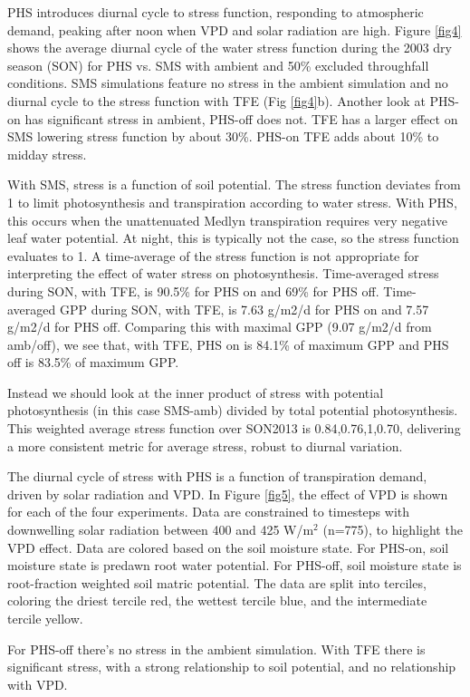 \documentclass[draft,linenumbers]{agujournal}
\begin{document}
PHS introduces diurnal cycle to stress function, responding to atmospheric demand, peaking after noon
when VPD and solar radiation are high. 
Figure \ref{fig4} shows the average diurnal cycle of the water stress function during the 2003 dry season (SON)
for PHS vs. SMS with ambient and 50\% excluded throughfall conditions.
SMS simulations feature no stress in the ambient simulation and no diurnal cycle to the stress function with TFE (Fig \ref{fig4}b).
Another look at PHS-on has significant stress in ambient, PHS-off does not.
TFE has a larger effect on SMS lowering stress function by about 30\%.
PHS-on TFE adds about 10\% to midday stress.

With SMS, stress is a function of soil potential.
The stress function deviates from 1 to limit photosynthesis and transpiration according to water stress.
With PHS, this occurs when the unattenuated Medlyn transpiration requires very negative leaf water potential.
At night, this is typically not the case, so the stress function evaluates to 1. 
A time-average of the stress function is not appropriate for interpreting the effect of water stress on photosynthesis.
Time-averaged stress during SON, with TFE, is 90.5\% for PHS on and 69\% for PHS off.
Time-averaged GPP during SON,  with TFE, is 7.63 g/m2/d for PHS on and 7.57 g/m2/d for PHS off.
Comparing this with maximal GPP (9.07 g/m2/d from amb/off), we see that,
with TFE, PHS on is 84.1\% of maximum GPP and PHS off is 83.5\% of maximum GPP.

Instead we should look at the inner product of stress with potential photosynthesis (in this case SMS-amb) divided by total potential photosynthesis.
This weighted average stress function over SON2013 is 0.84,0.76,1,0.70, delivering a more consistent metric for average stress, robust to diurnal variation.

The diurnal cycle of stress with PHS is a function of transpiration demand, driven by solar radiation and VPD. 
In Figure \ref{fig5}, the effect of VPD is shown for each of the four experiments. 
Data are constrained to timesteps with downwelling solar radiation between 400 and 425 W/m$^2$ (n=775), to highlight the VPD effect. 
Data are colored based on the soil moisture state. 
For PHS-on, soil moisture state is predawn root water potential. 
For PHS-off, soil moisture state is root-fraction weighted soil matric potential. 
The data are split into terciles, coloring the driest tercile red, the wettest tercile blue, and the intermediate tercile yellow.

For PHS-off there's no stress in the ambient simulation. 
With TFE there is significant stress, with a strong relationship to soil potential, and no relationship with VPD. 
\end{document}
